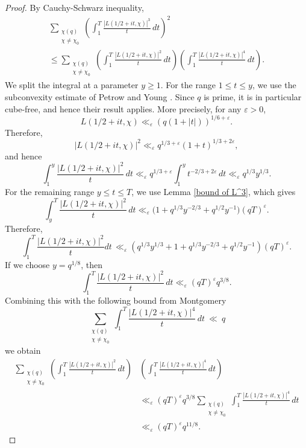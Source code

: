 \documentclass[oneside,reqno,10pt]{amsart}
\numberwithin{equation}{section}
\theoremstyle{plain}
\theoremstyle{definition}
\numberwithin{equation}{section}
\begin{document}
\begin{proof}
    By Cauchy-Schwarz inequality,
    \begin{multline*}
        \sum_{\substack{\chi(q)\\ \chi\neq \chi_0}}\left(\int_{1}^T\frac{|L(1/2+it,\chi)|^3}{t}\,dt\right)^2\\ \leq \sum_{\substack{\chi(q)\\ \chi\neq \chi_0}}\left(\int_{1}^T\frac{|L(1/2+it,\chi)|^2}{t}\,dt\right)\left(\int_{1}^T\frac{|L(1/2+it,\chi)|^4}{t}\,dt\right).
    \end{multline*}
We split the integral at a parameter $y\ge 1$. For the range $1\le t\le y$, we use the subconvexity estimate of Petrow and Young \cite[Corollary 1.3]{PY}. Since $q$ is prime, it is in particular cube-free, and hence their result applies. More precisely, for any $\varepsilon>0$,
\begin{equation}
    L(1/2+it,\chi)\ll_\varepsilon (q(1+|t|))^{1/6+\varepsilon}.
\end{equation}\label{petrow young boundu}
Therefore,
\begin{equation*}
    |L(1/2+it,\chi)|^2\ll_\varepsilon q^{1/3+\varepsilon}(1+t)^{1/3+2\varepsilon},
\end{equation*}
and hence
\begin{equation*}
    \int_1^y \frac{|L(1/2+it,\chi)|^2}{t}\,dt
    \ll_\varepsilon
    q^{1/3+\varepsilon}\int_1^y t^{-2/3+2\varepsilon}\,dt
    \ll_\varepsilon
    q^{1/3}y^{1/3}.
\end{equation*}
For the remaining range $y\le t\le T$, we use Lemma \ref{bound of L^3}, which gives
\begin{equation*}
    \int_y^T \frac{|L(1/2+it,\chi)|^2}{t}\,dt
    \ll_\varepsilon
    \bigl(1+q^{1/3}y^{-2/3}+q^{1/2}y^{-1}\bigr)(qT)^\varepsilon.
\end{equation*}
Therefore,
\begin{equation*}
     \int_{1}^T\frac{|L(1/2+it,\chi)|^2}{t}dt\, \ll_{\varepsilon} \left(q^{1/3}y^{1/3}+1+q^{1/3}y^{-2/3}+q^{1/2}y^{-1}\right)(qT)^{\varepsilon}.
\end{equation*}
    If we choose $y=q^{1/8}$, then $$\int_{1}^T\frac{|L(1/2+it,\chi)|^2}{t}\,dt\ll_{\varepsilon}(qT)^{\varepsilon}q^{3/8}.$$ Combining this with the following bound from Montgomery \cite[Theorem 10.1]{Mon}
    \begin{equation*}
         \sum_{\substack{\chi(q)\\ \chi\neq \chi_0}}\int_{1}^T\frac{|L(1/2+it,\chi)|^4}{t}\,dt\ \ll \ q
    \end{equation*}
    we obtain
    \begin{align*}
        \sum_{\substack{\chi(q)\\ \chi\neq \chi_0}}\left(\int_{1}^T\frac{|L(1/2+it,\chi)|^2}{t}\,dt\right)&\left(\int_{1}^T\frac{|L(1/2+it,\chi)|^4}{t}\,dt\right)\\
        &\ll_{\varepsilon} (qT)^{\varepsilon}q^{3/8}\sum_{\substack{\chi(q)\\ \chi\neq \chi_0}}\int_{1}^T\frac{|L(1/2+it,\chi)|^4}{t}\,dt\\
        &\ll_{\varepsilon}(qT)^{\varepsilon}q^{11/8}.
    \end{align*}
\end{proof}
\end{document}
